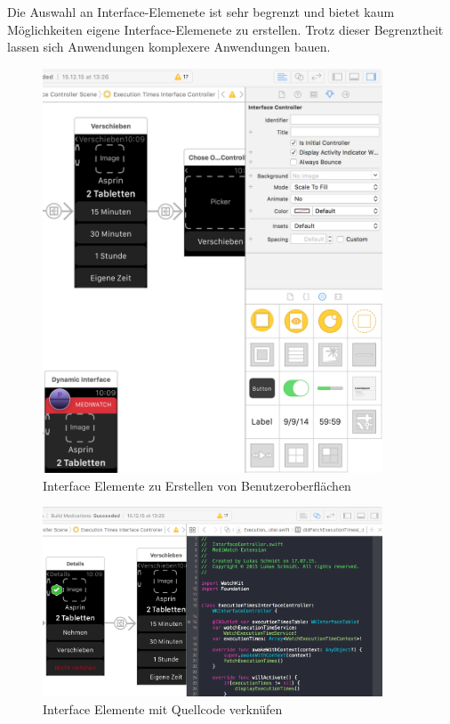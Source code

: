 Die Auswahl an Interface-Elemenete ist sehr begrenzt und bietet kaum Möglichkeiten eigene Interface-Elemenete zu erstellen. Trotz dieser Begrenztheit lassen sich Anwendungen komplexere Anwendungen bauen.
\begin{figure}
	\caption{Interface Elemente zu Erstellen von Benutzeroberflächen}
	\label{fig:xcode-interface-elements}
	\centering
		\includegraphics[width=0.9\textwidth]{04_realisation/screenshots/xcode-interface-elements}
\end{figure}

\begin{figure}
	\caption{Interface Elemente mit Quellcode verknüfen}
	\label{fig:xcode-interface-code-connect}
	\centering
	\includegraphics[width=0.9\textwidth]{04_realisation/screenshots/xcode-interface-code-connect}
\end{figure}

